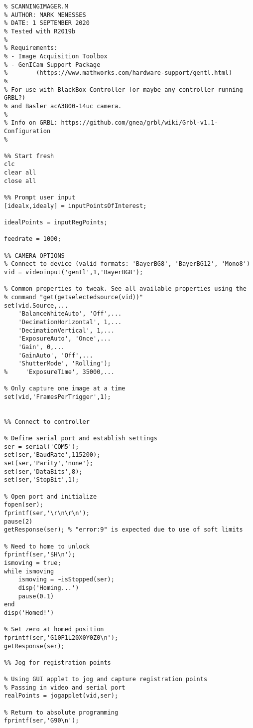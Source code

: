 \begin{lstlisting}
% SCANNINGIMAGER.M
% AUTHOR: MARK MENESSES
% DATE: 1 SEPTEMBER 2020
% Tested with R2019b
%
% Requirements:
% - Image Acquisition Toolbox
% - GenICam Support Package
%        (https://www.mathworks.com/hardware-support/gentl.html)
% 
% For use with BlackBox Controller (or maybe any controller running GRBL?)
% and Basler acA3800-14uc camera.
% 
% Info on GRBL: https://github.com/gnea/grbl/wiki/Grbl-v1.1-Configuration
%

%% Start fresh
clc
clear all
close all

%% Prompt user input
[idealx,idealy] = inputPointsOfInterest;

idealPoints = inputRegPoints;

feedrate = 1000;

%% CAMERA OPTIONS
% Connect to device (valid formats: 'BayerBG8', 'BayerBG12', 'Mono8')
vid = videoinput('gentl',1,'BayerBG8');

% Common properties to tweak. See all available properties using the
% command "get(getselectedsource(vid))"
set(vid.Source,...
    'BalanceWhiteAuto', 'Off',...
    'DecimationHorizontal', 1,...
    'DecimationVertical', 1,...
    'ExposureAuto', 'Once',...
    'Gain', 0,...
    'GainAuto', 'Off',...
    'ShutterMode', 'Rolling');
%     'ExposureTime', 35000,...

% Only capture one image at a time
set(vid,'FramesPerTrigger',1);


%% Connect to controller

% Define serial port and establish settings
ser = serial('COM5');
set(ser,'BaudRate',115200);
set(ser,'Parity','none');
set(ser,'DataBits',8);
set(ser,'StopBit',1);

% Open port and initialize
fopen(ser);
fprintf(ser,'\r\n\r\n');
pause(2)
getResponse(ser); % "error:9" is expected due to use of soft limits

% Need to home to unlock
fprintf(ser,'$H\n');
ismoving = true;
while ismoving
    ismoving = ~isStopped(ser);
    disp('Homing...')
    pause(0.1)
end
disp('Homed!')

% Set zero at homed position
fprintf(ser,'G10P1L20X0Y0Z0\n');
getResponse(ser);

%% Jog for registration points

% Using GUI applet to jog and capture registration points
% Passing in video and serial port
realPoints = jogapplet(vid,ser);

% Return to absolute programming
fprintf(ser,'G90\n');


\end{lstlisting}
